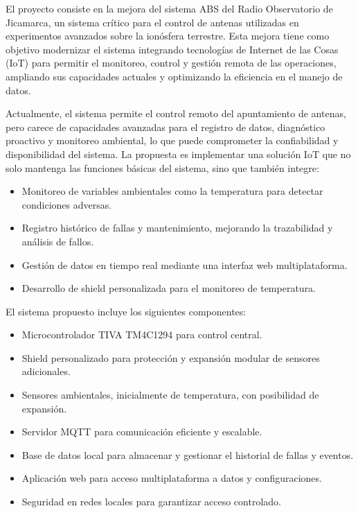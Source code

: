 \documentclass[
11pt, %
]{charter}
\begin{document}
El proyecto consiste en la mejora del sistema ABS del Radio Observatorio de Jicamarca, un sistema crítico para el control de antenas utilizadas en experimentos avanzados sobre la ionósfera terrestre. Esta mejora tiene como objetivo modernizar el sistema integrando tecnologías de Internet de las Cosas (IoT) para permitir el monitoreo, control y gestión remota de las operaciones, ampliando sus capacidades actuales y optimizando la eficiencia en el manejo de datos.

Actualmente, el sistema permite el control remoto del apuntamiento de antenas, pero carece de capacidades avanzadas para el registro de datos, diagnóstico proactivo y monitoreo ambiental, lo que puede comprometer la confiabilidad y disponibilidad del sistema. La propuesta es implementar una solución IoT que no solo mantenga las funciones básicas del sistema, sino que también integre:

\begin{itemize}
	\item Monitoreo de variables ambientales como la temperatura para detectar condiciones adversas.
	\item Registro histórico de fallas y mantenimiento, mejorando la trazabilidad y análisis de fallos.
	\item Gestión de datos en tiempo real mediante una interfaz web multiplataforma.
	\item Desarrollo de shield personalizada para el monitoreo de temperatura.
\end{itemize}

El sistema propuesto incluye los siguientes componentes:
\begin{itemize}
    \item Microcontrolador TIVA TM4C1294 para control central.

	\item Shield personalizado para protección y expansión modular de sensores adicionales.

	\item Sensores ambientales, inicialmente de temperatura, con posibilidad de expansión.

	\item Servidor MQTT para comunicación eficiente y escalable.

	\item Base de datos local para almacenar y gestionar el historial de fallas y eventos.

	\item Aplicación web para acceso multiplataforma a datos y configuraciones.

	\item Seguridad en redes locales para garantizar acceso controlado.	
\end{itemize}
\end{document}
